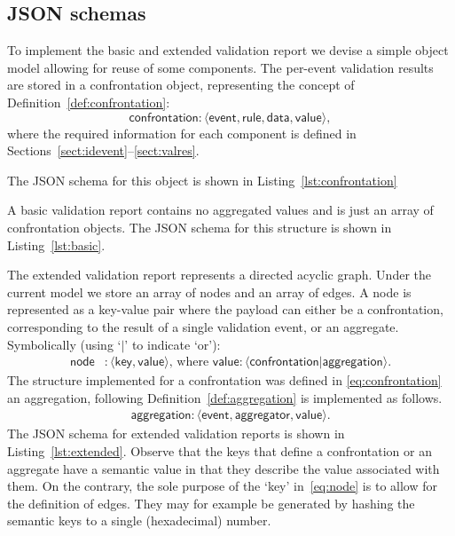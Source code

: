 \documentclass[a4paper, 11pt,titlepage]{article}
\begin{document}
\subsection{JSON schemas}
To implement the basic and extended validation report we devise a simple object model
allowing for reuse of some components. The per-event validation results are stored in
a confrontation object, representing the concept of Definition~\ref{def:confrontation}:
\begin{equation}
\label{eq:confrontation}
\textsf{confrontation}:\langle\textsf{event}, \textsf{rule}, \textsf{data}, \textsf{value}\rangle,
\end{equation}
where the required information for each component is defined in Sections~\ref{sect:idevent}--\ref{sect:valres}.

The JSON schema for this object is shown in Listing~\ref{lst:confrontation}
%

%
A basic validation report contains no aggregated values and is just an array of confrontation
objects. The JSON schema for this structure is shown in Listing~\ref{lst:basic}.
%

%

The extended validation report represents a directed acyclic graph. Under the
current model we store an array of nodes and an array of edges. A node
is represented as a key-value pair where the payload can either be a confrontation,
corresponding to the result of a single validation event, or an aggregate.
Symbolically (using `$|$' to indicate `or'):
\begin{align}
\label{eq:node}
\textsf{node} &: \langle \textsf{key},\textsf{value}\rangle\textrm{, where }
\textsf{value} : \langle \textsf{confrontation} | \textsf{aggregation}\rangle.
\end{align}
The structure implemented for a confrontation was defined in
\eqref{eq:confrontation} an aggregation, following
Definition~\ref{def:aggregation} is implemented as follows.
\begin{align}
\textsf{aggregation} : \langle\textsf{event}, \textsf{aggregator}, \textsf{value}\rangle.
\end{align}
The JSON schema for extended validation reports is shown in Listing~\ref{lst:extended}.
Observe that the keys that define a confrontation or an aggregate have a
semantic value in that they describe the value associated with them. On the
contrary, the sole purpose of the `key' in~\eqref{eq:node} is to allow for the
definition of edges. They may for example be generated by hashing the semantic
keys to a single (hexadecimal) number.
\end{document}
